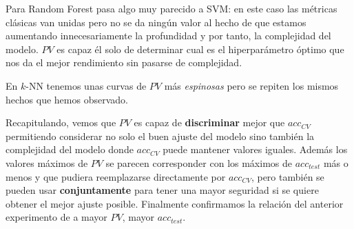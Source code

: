 Para Random Forest pasa algo muy parecido a SVM: en este caso las métricas clásicas van unidas pero no se da ningún valor al hecho de que estamos aumentando innecesariamente la profundidad y por tanto, la complejidad del modelo. $PV$ es capaz él solo de determinar cual es el hiperparámetro óptimo que nos da el mejor rendimiento sin pasarse de complejidad.

En $k$-NN tenemos unas curvas de $PV$ más \emph{espinosas} pero se repiten los mismos hechos que hemos observado.

Recapitulando, vemos que $PV$ es capaz de \textbf{discriminar} mejor que $acc_{CV}$ permitiendo considerar no solo el buen ajuste del modelo sino también la complejidad del modelo donde $acc_{CV}$ puede mantener valores iguales. Además los valores máximos de $PV$ se parecen corresponder con los máximos de $acc_{test}$ más o menos y que pudiera reemplazarse directamente por $acc_{CV}$, pero también se pueden usar \textbf{conjuntamente} para tener una mayor seguridad si se quiere obtener el mejor ajuste posible. Finalmente confirmamos la relación del anterior experimento de a mayor $PV$, mayor $acc_{test}$.

\endinput
